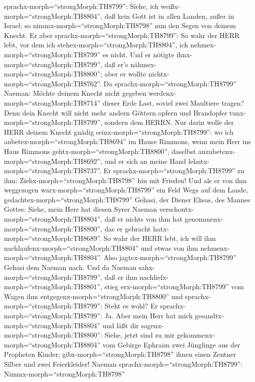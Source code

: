 sprachx-morph=``strongMorph:TH8799'': Siehe, ich
weißx-morph=``strongMorph:TH8804'', daß kein Gott ist in allen Landen,
außer in Israel; so nimmx-morph=``strongMorph:TH8798'' nun den Segen von
deinem Knecht.  Er aber
sprachx-morph=``strongMorph:TH8799'': So wahr der HERR lebt, vor dem ich
stehex-morph=``strongMorph:TH8804'', ich
nehmex-morph=``strongMorph:TH8799'' es nicht. Und er nötigte
ihnx-morph=``strongMorph:TH8799'', daß er's
nähmex-morph=``strongMorph:TH8800''; aber er wollte
nichtx-morph=``strongMorph:TH8762''.  Da
sprachx-morph=``strongMorph:TH8799'' Naeman: Möchte deinem Knecht nicht
gegeben werdenx-morph=``strongMorph:TH8714'' dieser Erde Last, soviel
zwei Maultiere tragen? Denn dein Knecht will nicht mehr andern Göttern
opfern und Brandopfer tunx-morph=``strongMorph:TH8799'', sondern dem
HERRN.  Nur darin wolle der HERR deinem Knecht gnädig
seinx-morph=``strongMorph:TH8799'': wo ich
anbetex-morph=``strongMorph:TH8694'' im Hause Rimmons, wenn mein Herr
ins Haus Rimmons gehtx-morph=``strongMorph:TH8800'', daselbst
anzubetenx-morph=``strongMorph:TH8692'', und er sich an meine Hand
lehntx-morph=``strongMorph:TH8737''.  Er
sprachx-morph=``strongMorph:TH8799'' zu ihm:
Ziehx-morph=``strongMorph:TH8798'' hin mit Frieden! Und als er von ihm
weggezogen warx-morph=``strongMorph:TH8799'' ein Feld Wegs auf dem
Lande,  gedachtex-morph=``strongMorph:TH8799'' Gehasi, der
Diener Elisas, des Mannes Gottes: Siehe, mein Herr hat diesen Syrer
Naeman verschontx-morph=``strongMorph:TH8804'', daß er nichts von ihm
hat genommenx-morph=``strongMorph:TH8800'', das er gebracht
hatx-morph=``strongMorph:TH8689''. So wahr der HERR lebt, ich will ihm
nachlaufenx-morph=``strongMorph:TH8804'' und etwas von ihm
nehmenx-morph=``strongMorph:TH8804''.  Also
jagtex-morph=``strongMorph:TH8799'' Gehasi dem Naeman nach. Und da
Naeman sahx-morph=``strongMorph:TH8799'', daß er ihm
nachliefx-morph=``strongMorph:TH8801'', stieg
erx-morph=``strongMorph:TH8799'' vom Wagen ihm
entgegenx-morph=``strongMorph:TH8800'' und
sprachx-morph=``strongMorph:TH8799'': Steht es wohl?  Er
sprachx-morph=``strongMorph:TH8799'': Ja. Aber mein Herr hat mich
gesandtx-morph=``strongMorph:TH8804'' und läßt dir
sagenx-morph=``strongMorph:TH8800'': Siehe, jetzt sind zu mir
gekommenx-morph=``strongMorph:TH8804'' vom Gebirge Ephraim zwei
Jünglinge aus der Propheten Kinder; gibx-morph=``strongMorph:TH8798''
ihnen einen Zentner Silber und zwei Feierkleider!  Naeman
sprachx-morph=``strongMorph:TH8799'': Nimmx-morph=``strongMorph:TH8798''

